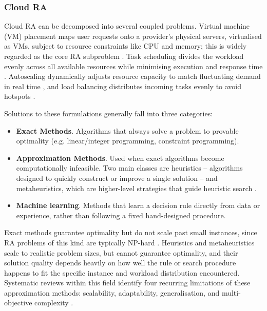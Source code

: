 \documentclass[12pt]{article}
\begin{document}
\subsubsection{Cloud RA}
Cloud RA can be decomposed into several coupled problems. Virtual machine (VM) placement maps user requests onto a provider's physical servers, virtualised as VMs, subject to resource constraints like CPU and memory; this is widely regarded as the core RA subproblem \cite{saidi2023}. Task scheduling divides the workload evenly across all available resources while minimising execution and response time \cite{lbts2024}. Autoscaling dynamically adjusts resource capacity to match fluctuating demand in real time \cite{autoscaling2023}, and load balancing distributes incoming tasks evenly to avoid hotspots \cite{lb2024}.

Solutions to these formulations generally fall into three categories:
\begin{itemize}
    \item \textbf{Exact Methods}. Algorithms that always solve a problem to provable optimality (e.g. linear/integer programming, constraint programming).
    \item \textbf{Approximation Methods}. Used when exact algorithms become computationally infeasible. Two main classes are heuristics -- algorithms designed to quickly construct or improve a single solution -- and metaheuristics, which are higher-level strategies that guide heuristic search \cite{alkhalifa2025comparative}.
    \item \textbf{Machine learning}. Methods that learn a decision rule directly from data or experience, rather than following a fixed hand-designed procedure.
\end{itemize}
Exact methods guarantee optimality but do not scale past small instances, since RA problems of this kind are typically NP-hard \cite{approx2015}. Heuristics and metaheuristics scale to realistic problem sizes, but cannot guarantee optimality, and their solution quality depends heavily on how well the rule or search procedure happens to fit the specific instance and workload distribution encountered. Systematic reviews within this field identify four recurring limitations of these approximation methods: scalability, adaptability, generalisation, and multi-objective complexity \cite{lbts2024, mohamaddiah2014, ml_ra_litrev2025}.
\end{document}
